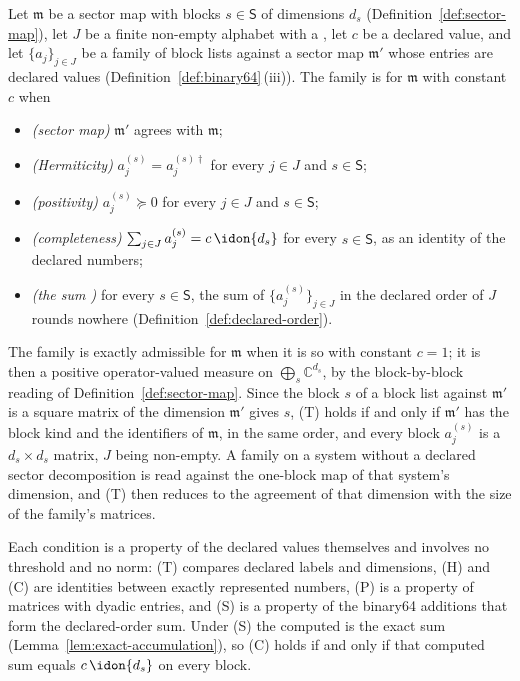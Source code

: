 \begin{definition}\label{def:exact-admissibility}
Let $\mathfrak{m}$ be a sector map with blocks $s\in\mathsf{S}$ of
dimensions $d_s$ (Definition~\ref{def:sector-map}), let $J$ be a finite
non-empty alphabet with a , let $c$ be a declared value,
and let
$\{a_j\}_{j\in J}$ be a family of block lists against a sector map
$\mathfrak{m}'$ whose entries are declared values
(Definition~\ref{def:binary64}\,(iii)). The family is
 for $\mathfrak{m}$ with constant $c$ when
\begin{itemize}[leftmargin=2.6em]
\item[(T)] \emph{(sector map)} $\mathfrak{m}'$ agrees with $\mathfrak{m}$;
\item[(H)] \emph{(Hermiticity)} $a^{(s)}_j=a^{(s)\dagger}_j$ for every
  $j\in J$ and $s\in\mathsf{S}$;
\item[(P)] \emph{(positivity)} $a^{(s)}_j\succeq0$ for every $j\in J$ and
  $s\in\mathsf{S}$;
\item[(C)] \emph{(completeness)} $\sum_{j\in J}a^{(s)}_j=c\,\idon{d_s}$ for
  every $s\in\mathsf{S}$, as an identity of the declared numbers;
\item[(S)] \emph{(the sum )} for every
  $s\in\mathsf{S}$, the sum of $\{a^{(s)}_j\}_{j\in J}$ in the declared order
  of $J$ rounds nowhere (Definition~\ref{def:declared-order}).
\end{itemize}
The family is exactly admissible for $\mathfrak{m}$ when it is so with
constant $c=1$; it is then a positive operator-valued measure on
$\bigoplus_{s}\mathbb{C}^{d_s}$, by the block-by-block reading of
Definition~\ref{def:sector-map}. Since the block $s$ of a block list against
$\mathfrak{m}'$ is a square matrix of the dimension $\mathfrak{m}'$ gives $s$,
(T) holds if and only if $\mathfrak{m}'$ has the block kind and the
identifiers of $\mathfrak{m}$, in the same order, and every block $a^{(s)}_j$
is a $d_s\times d_s$ matrix, $J$ being non-empty. A family on a system without a declared sector
decomposition is read against the one-block map of that system's dimension,
and (T) then reduces to the agreement of that dimension with the size of the
family's matrices.

Each condition is a property of the declared values themselves and involves no
threshold and no norm: (T) compares declared labels and dimensions, (H) and (C)
are identities between exactly represented numbers, (P) is a property of
matrices with dyadic entries, and (S) is a property of the binary64 additions
that form the declared-order sum. Under (S) the computed
 is the exact sum
(Lemma~\ref{lem:exact-accumulation}), so (C) holds if and only if that
computed sum equals $c\,\idon{d_s}$ on every block.
\end{definition}
